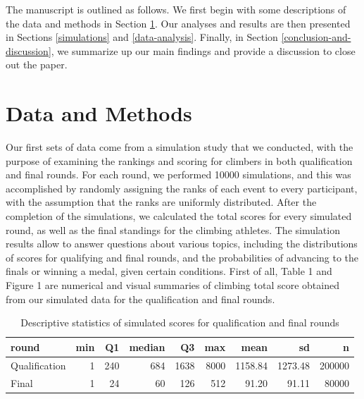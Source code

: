 \documentclass[12pt]{article}
\begin{document}
The manuscript is outlined as follows. We first begin with some
descriptions of the data and methods in Section \ref{data-and-methods}.
Our analyses and results are then presented in Sections
\ref{simulations} and \ref{data-analysis}. Finally, in Section
\ref{conclusion-and-discussion}, we summarize up our main findings and
provide a discussion to close out the paper.

\hypertarget{data-and-methods}{%
\section{Data and Methods}\label{data-and-methods}}

Our first sets of data come from a simulation study that we conducted,
with the purpose of examining the rankings and scoring for climbers in
both qualification and final rounds. For each round, we performed 10000
simulations, and this was accomplished by randomly assigning the ranks
of each event to every participant, with the assumption that the ranks
are uniformly distributed. After the completion of the simulations, we
calculated the total scores for every simulated round, as well as the
final standings for the climbing athletes. The simulation results allow
to answer questions about various topics, including the distributions of
scores for qualifying and final rounds, and the probabilities of
advancing to the finals or winning a medal, given certain conditions.
First of all, Table 1 and Figure 1 are numerical and visual summaries of
climbing total score obtained from our simulated data for the
qualification and final rounds.

\begin{table}[H]

\caption{\label{tab:unnamed-chunk-4}Descriptive statistics of simulated scores for qualification and final rounds}
\centering
\begin{tabular}[t]{lrrrrrrrr}
\toprule
round & min & Q1 & median & Q3 & max & mean & sd & n\\
\midrule
Qualification & 1 & 240 & 684 & 1638 & 8000 & 1158.84 & 1273.48 & 200000\\
Final & 1 & 24 & 60 & 126 & 512 & 91.20 & 91.11 & 80000\\
\bottomrule
\end{tabular}
\end{table}
\end{document}
